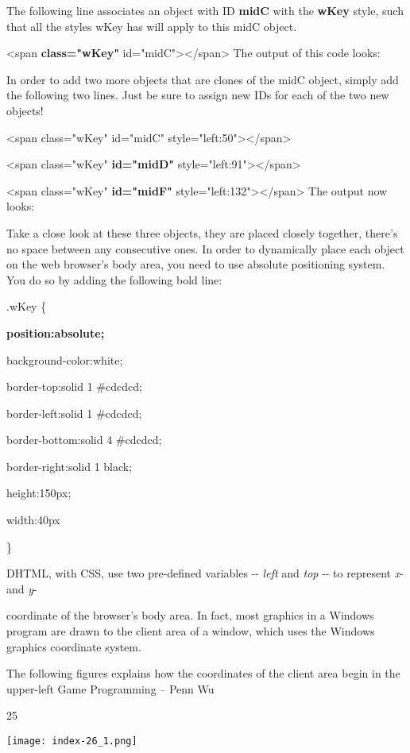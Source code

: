 \documentclass[
]{article}
\begin{document}
The following line associates an object with ID \textbf{midC} with the
\textbf{wKey} style, such that all the styles wKey has will apply to
this midC object.

\textless span \textbf{class="wKey"}
id="midC"\textgreater\textless/span\textgreater{} The output of this
code looks:

In order to add two more objects that are clones of the midC object,
simply add the following two lines. Just be sure to assign new IDs for
each of the two new objects!

\textless span class="wKey" id="midC"
style="left:50"\textgreater\textless/span\textgreater{}

\textless span class="wKey" \textbf{id="midD"}
style="left:91"\textgreater\textless/span\textgreater{}

\textless span class="wKey" \textbf{id="midF"}
style="left:132"\textgreater\textless/span\textgreater{} The output now
looks:

Take a close look at these three objects, they are placed closely
together, there's no space between any consecutive ones. In order to
dynamically place each object on the web browser's body area, you need
to use absolute positioning system. You do so by adding the following
bold line:

.wKey \{

\textbf{position:absolute;}

background-color:white;

border-top:solid 1 \#cdcdcd;

border-left:solid 1 \#cdcdcd;

border-bottom:solid 4 \#cdcdcd;

border-right:solid 1 black;

height:150px;

width:40px

\}

DHTML, with CSS, use two pre-defined variables -\/- \emph{left} and
\emph{top} -\/- to represent \emph{x}- and \emph{y}-

coordinate of the browser's body area. In fact, most graphics in a
Windows program are drawn to the client area of a window, which uses the
Windows graphics coordinate system.

The following figures explains how the coordinates of the client area
begin in the upper-left Game Programming -- Penn Wu

25

\protect\hypertarget{index_split_003.htmlux5cux23p26}{}{}\texttt{[image: index-26\_1.png]}
\end{document}
